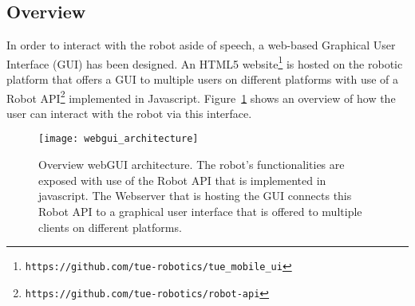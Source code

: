 \subsection*{Overview}

In order to interact with the robot aside of speech, a web-based Graphical User Interface (GUI) has been designed. An HTML5 website\footnote{\texttt{https://github.com/tue-robotics/tue\_mobile\_ui}} is hosted on the robotic platform that offers a GUI to multiple users on different platforms with use of a Robot API\footnote{\texttt{https://github.com/tue-robotics/robot-api}} implemented in Javascript. Figure~\ref{fig:webgui_architecture} shows an overview of how the user can interact with the robot via this interface.

\begin{figure}[ht]
        \texttt{[image: webgui\_architecture]}
        \caption{Overview webGUI architecture. The robot's functionalities are exposed with use of the Robot API that is implemented in javascript. The Webserver that is hosting the GUI connects this Robot API to a graphical user interface that is offered to multiple clients on different platforms.}
        \label{fig:webgui_architecture}
\end{figure}


